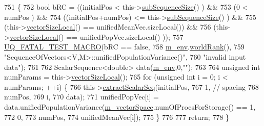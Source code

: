 \begin{DoxyCode}
751 \{
752   \textcolor{keywordtype}{bool} bRC = ((initialPos              <  this->\hyperlink{class_q_u_e_s_o_1_1_sequence_of_vectors_a0224bd3e961d86af5d2886301c0c2b86}{subSequenceSize}()   ) &&
753               (0                       <  numPos                    ) &&
754               ((initialPos+numPos)     <= this->\hyperlink{class_q_u_e_s_o_1_1_sequence_of_vectors_a0224bd3e961d86af5d2886301c0c2b86}{subSequenceSize}()   ) &&
755               (this->\hyperlink{class_q_u_e_s_o_1_1_base_vector_sequence_a2fefedf9e5b90f22881103b3f92555f6}{vectorSizeLocal}() == unifiedMeanVec.sizeLocal()) &&
756               (this->\hyperlink{class_q_u_e_s_o_1_1_base_vector_sequence_a2fefedf9e5b90f22881103b3f92555f6}{vectorSizeLocal}() == unifiedPopVec.sizeLocal() ));
757   \hyperlink{_defines_8h_a56d63d18d0a6d45757de47fcc06f574d}{UQ\_FATAL\_TEST\_MACRO}(bRC == \textcolor{keyword}{false},
758                       \hyperlink{class_q_u_e_s_o_1_1_base_vector_sequence_a8e8824d2a63c5a43bcc6473e3a0491e8}{m\_env}.\hyperlink{class_q_u_e_s_o_1_1_base_environment_a78b57112bbd0e6dd0e8afec00b40ffa7}{worldRank}(),
759                       \textcolor{stringliteral}{"SequenceOfVectors<V,M>::unifiedPopulationVariance()"},
760                       \textcolor{stringliteral}{"invalid input data"});
761 
762   ScalarSequence<double> data(\hyperlink{class_q_u_e_s_o_1_1_base_vector_sequence_a8e8824d2a63c5a43bcc6473e3a0491e8}{m\_env},0,\textcolor{stringliteral}{""});
763 
764   \textcolor{keywordtype}{unsigned} \textcolor{keywordtype}{int} numParams = this->\hyperlink{class_q_u_e_s_o_1_1_base_vector_sequence_a2fefedf9e5b90f22881103b3f92555f6}{vectorSizeLocal}();
765   \textcolor{keywordflow}{for} (\textcolor{keywordtype}{unsigned} \textcolor{keywordtype}{int} i = 0; i < numParams; ++i) \{
766     this->\hyperlink{class_q_u_e_s_o_1_1_sequence_of_vectors_ac977b3b26a6af2ae727671f1246262fd}{extractScalarSeq}(initialPos,
767                            1, \textcolor{comment}{// spacing}
768                            numPos,
769                            i,
770                            data);
771     unifiedPopVec[i] = data.unifiedPopulationVariance(\hyperlink{class_q_u_e_s_o_1_1_base_vector_sequence_a4bd171e39ed050ff105c808336f35198}{m\_vectorSpace}.numOfProcsForStorage() == 
      1,
772                                                       0,
773                                                       numPos,
774                                                       unifiedMeanVec[i]);
775   \}
776 
777   \textcolor{keywordflow}{return};
778 \}
\end{DoxyCode}
